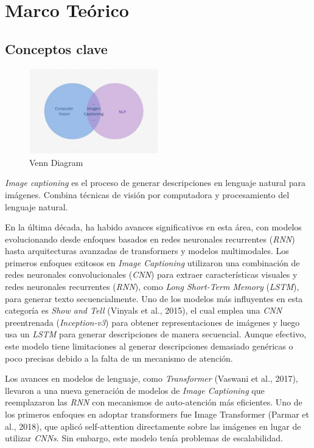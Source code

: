 \documentclass[14pt]{extarticle}
\begin{document}
\section{Marco Teórico}

\subsection{Conceptos clave}

\begin{figure}[h]
    \centering
    \includegraphics[width=0.5\textwidth]{./images/venn.jpg}
    \caption{Venn Diagram}
    \label{fig:venn}
\end{figure}

\textit{Image captioning} es el proceso de generar descripciones en lenguaje natural para imágenes. Combina técnicas de visión por computadora y procesamiento del lenguaje natural.

En la última década, ha habido avances significativos en esta área, con modelos evolucionando desde enfoques basados en redes neuronales recurrentes (\textit{RNN}) hasta arquitecturas avanzadas de transformers y modelos multimodales. Los primeros enfoques exitosos en \textit{Image Captioning} utilizaron una combinación de redes neuronales convolucionales (\textit{CNN}) para extraer características visuales y redes neuronales recurrentes (\textit{RNN}), como \textit{Long Short-Term Memory} (\textit{LSTM}), para generar texto secuencialmente. Uno de los modelos más influyentes en esta categoría es \textit{Show and Tell} (Vinyals et al., 2015), el cual emplea una \textit{CNN} preentrenada (\textit{Inception-v3}) para obtener representaciones de imágenes y luego usa un \textit{LSTM} para generar descripciones de manera secuencial. Aunque efectivo, este modelo tiene limitaciones al generar descripciones demasiado genéricas o poco precisas debido a la falta de un mecanismo de atención.

Los avances en modelos de lenguaje, como \textit{Transformer} (Vaswani et al., 2017), llevaron a una nueva generación de modelos de \textit{Image Captioning} que reemplazaron las \textit{RNN} con mecanismos de auto-atención más eficientes. Uno de los primeros enfoques en adoptar transformers fue Image Transformer (Parmar et al., 2018), que aplicó self-attention directamente sobre las imágenes en lugar de utilizar \textit{CNNs}. Sin embargo, este modelo tenía problemas de escalabilidad.
\end{document}
